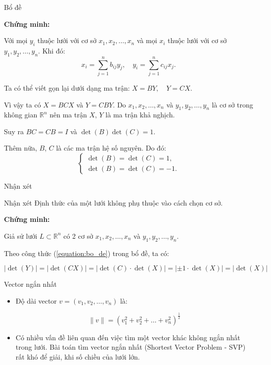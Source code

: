 \documentclass{beamer}
\numberwithin{equation}{section}
\begin{document}
\begin{frame}{Bổ đề}

\textbf{Chứng minh:}

Với mọi $y_i$ thuộc lưới với cơ sở $x_1, x_2, \ldots, x_n$ và mọi $x_i$ thuộc lưới với cơ sở $y_1, y_2, \ldots, y_n$. Khi đó:
\[
x_i = \sum_{j=1}^n b_{ij} y_j, \quad y_i = \sum_{j=1}^n c_{ij} x_j.
\]

Ta có thể viết gọn lại dưới dạng ma trận:
$X = BY, \quad Y = CX.$

Vì vậy ta có $X = BCX$ và $Y = CBY$. Do $x_1, x_2, \ldots, x_n$ và $y_1, y_2, \ldots, y_n$ là cơ sở trong không gian $\mathbb{R}^n$ nên ma trận $X$, $Y$ là ma trận khả nghịch.

Suy ra $BC = CB = I$ và $\det(B) \det(C) = 1$.

Thêm nữa, $B$, $C$ là các ma trận hệ số nguyên. Do đó:
\[
\begin{cases}
\det(B) = \det(C) = 1, \\
\det(B) = \det(C) = -1.
\end{cases}
\]

\end{frame}
\begin{frame}{Nhận xét}

\begin{block}{Nhận xét}
Định thức của một lưới không phụ thuộc vào cách chọn cơ sở.
\end{block}

\textbf{Chứng minh:}

Giả sử lưới $L \subset \mathbb{R}^n$ có 2 cơ sở $x_1, x_2, \ldots, x_n$ và $y_1, y_2, \ldots, y_n$.

Theo công thức (\ref{equation:bo_de}) trong bổ đề, ta có:

\[
|\det(Y)| = |\det(CX)| = |\det(C) \cdot \det(X)| = |\pm 1 \cdot \det(X)| = |\det(X)|
\]

\end{frame}
\begin{frame}{Vector ngắn nhất}

\begin{itemize}
\item Độ dài vector $v = (v_1, v_2, \dots, v_n)$ là:

$$\|v\| = (v_1^2 + v_2^2 + \dots + v_n^2)^{\tfrac{1}{2}}$$

\item Có nhiều vấn đề liên quan đến việc tìm một vector khác không ngắn nhất trong lưới.
Bài toán tìm vector ngắn nhất (Shortest Vector Problem - SVP) rất khó để giải, khi số chiều của lưới lớn.

\end{itemize}

\end{frame}
\end{document}
